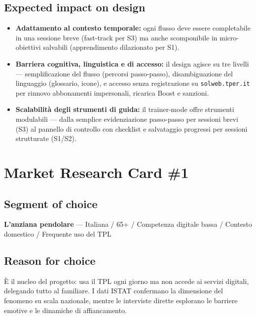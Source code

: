 ﻿\documentclass[11pt,a4paper]{article}
\begin{document}
\vspace{0.4cm}

\subsection{Expected impact on design}

\begin{itemize}[leftmargin=*,itemsep=6pt]

    \item \textbf{Adattamento al contesto temporale:}
    ogni flusso deve essere completabile in una sessione breve
    (fast-track per S3) ma anche scomponibile in micro-obiettivi
    salvabili (apprendimento dilazionato per S1).

    \item \textbf{Barriera cognitiva, linguistica e di accesso:}
    il design agisce su tre livelli --- semplificazione del flusso
    (percorsi passo-passo), disambiguazione del linguaggio (glossario,
    icone), e accesso senza registrazione su \texttt{solweb.tper.it}
    per rinnovo abbonamenti impersonali, ricarica Boost e sanzioni.

    \item \textbf{Scalabilità degli strumenti di guida:}
    il trainer-mode offre strumenti modulabili --- dalla semplice
    evidenziazione passo-passo per sessioni brevi (S3) al pannello di
    controllo con checklist e salvataggio progressi per sessioni
    strutturate (S1/S2).

\end{itemize}

\newpage 

\section{Market Research Card \#1}

\subsection*{Segment of choice}
\begin{tcolorbox}[base]
\textbf{L'anziana pendolare} --- Italiana / 65+ / Competenza digitale
bassa / Contesto domestico / Frequente uso del TPL
\end{tcolorbox}

\subsection*{Reason for choice}
\begin{tcolorbox}[base]
È il nucleo del progetto: usa il TPL ogni giorno ma non accede ai
servizi digitali, delegando tutto al familiare. I dati ISTAT confermano
la dimensione del fenomeno su scala nazionale, mentre le interviste
dirette esplorano le barriere emotive e le dinamiche di affiancamento.
\end{tcolorbox}
\end{document}
